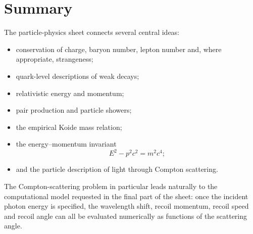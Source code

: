 \documentclass[11pt,a4paper]{article}
\begin{document}
\section*{Summary}

The particle-physics sheet connects several central ideas:

\begin{itemize}
    \item conservation of charge, baryon number, lepton number and, where
    appropriate, strangeness;
    \item quark-level descriptions of weak decays;
    \item relativistic energy and momentum;
    \item pair production and particle showers;
    \item the empirical Koide mass relation;
    \item the energy--momentum invariant
    \[
    E^2-p^2c^2=m^2c^4;
    \]
    \item and the particle description of light through Compton scattering.
\end{itemize}

The Compton-scattering problem in particular leads naturally to the computational
model requested in the final part of the sheet: once the incident photon energy is
specified, the wavelength shift, recoil momentum, recoil speed and recoil angle can
all be evaluated numerically as functions of the scattering angle.
\end{document}
